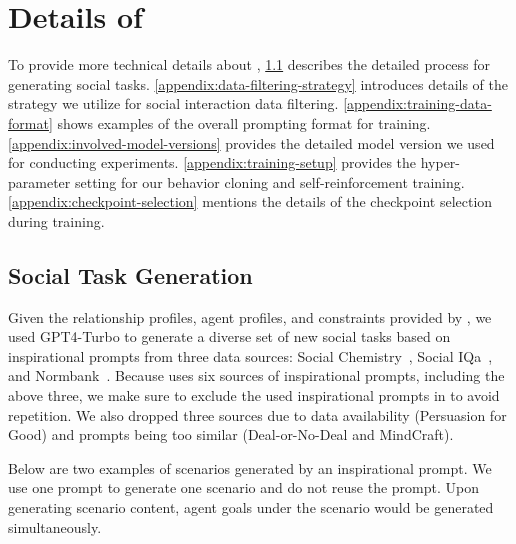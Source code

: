 \section{Details of \model}
To provide more technical details about \model, \ref{appendix:social-task-generation} describes the detailed process for generating social tasks. \ref{appendix:data-filtering-strategy} introduces details of the strategy we utilize for social interaction data filtering. \ref{appendix:training-data-format} shows examples of the overall prompting format for training. \ref{appendix:involved-model-versions} provides the detailed model version we used for conducting experiments. \ref{appendix:training-setup} provides the hyper-parameter setting for our behavior cloning and self-reinforcement training. \ref{appendix:checkpoint-selection} mentions the details of the checkpoint selection during training.

\subsection{Social Task Generation}
\label{appendix:social-task-generation}

Given the relationship profiles, agent profiles, and constraints provided by \model, we used GPT4-Turbo to generate a diverse set of new social tasks based on inspirational prompts from three data sources: Social Chemistry~\citep{forbes-etal-2020-social}, Social IQa~\citep{sap-etal-2019-social}, and Normbank~\citep{ziems-etal-2023-normbank}. Because \model uses six sources of inspirational prompts, including the above three, we make sure to exclude the used inspirational prompts in \model to avoid repetition. We also dropped three sources due to data availability (Persuasion for Good) and prompts being too similar (Deal-or-No-Deal and MindCraft).

Below are two examples of scenarios generated by an inspirational prompt. We use one prompt to generate one scenario and do not reuse the prompt. Upon generating scenario content, agent goals under the scenario would be generated simultaneously.

